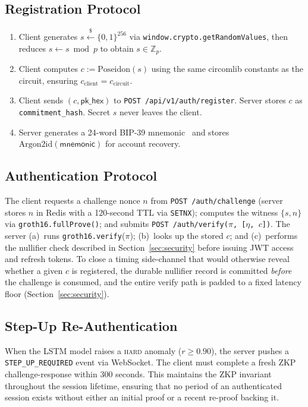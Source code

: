 \documentclass[journal,twoside,10pt]{IEEEtran}
\begin{document}
\subsection{Registration Protocol}
\begin{enumerate}
  \item Client generates $s \xleftarrow{\$} \{0,1\}^{256}$ via
        \texttt{window.crypto.getRandomValues}, then reduces
        $s \leftarrow s \bmod p$ to obtain $s \in \mathbb{Z}_p$.
  \item Client computes $c := \mathrm{Poseidon}(s)$ using the same
        circomlib constants as the circuit, ensuring
        $c_{\text{client}} = c_{\text{circuit}}$.
  \item Client sends $(c, \mathsf{pk\_hex})$ to
        \texttt{POST /api/v1/auth/register}. Server stores $c$ as
        \texttt{commitment\_hash}. Secret $s$ never leaves the client.
  \item Server generates a 24-word BIP-39 mnemonic~\cite{bip39} and stores
        $\mathrm{Argon2id}(\mathsf{mnemonic})$ for account recovery.
\end{enumerate}

\subsection{Authentication Protocol}
\label{sec:authprotocol}
The client requests a challenge nonce $n$ from
\texttt{POST /auth/challenge} (server stores $n$ in Redis with a 120-second
TTL via \texttt{SETNX}); computes the witness $\{s,n\}$ via
\texttt{groth16.fullProve()}; and submits
\texttt{POST /auth/verify($\pi$, [$\eta$, $c$])}. The server (a)~runs
\texttt{groth16.verify}($\pi$); (b)~looks up the stored $c$; and
(c)~performs the nullifier check described in
Section~\ref{sec:security} before issuing JWT access and refresh
tokens. To close a timing side-channel that would otherwise reveal whether
a given $c$ is registered, the durable nullifier record is committed
\emph{before} the challenge is consumed, and the entire verify path is
padded to a fixed latency floor (Section~\ref{sec:security}).

\subsection{Step-Up Re-Authentication}
When the LSTM model raises a \textsc{hard} anomaly ($r \geq 0.90$), the
server pushes a \texttt{STEP\_UP\_REQUIRED} event via WebSocket. The client
must complete a fresh ZKP challenge-response within 300 seconds. This
maintains the ZKP invariant throughout the session lifetime, ensuring that
no period of an authenticated session exists without either an initial proof
or a recent re-proof backing it.
\end{document}
